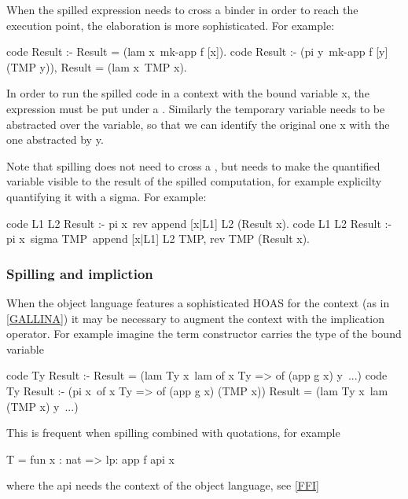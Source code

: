 \documentclass[a4paper, 11pt]{book}
\begin{document}
When the spilled expression needs to cross a binder in order to
reach the execution point, the elaboration is more sophisticated.
For example: 

\begin{elpicode}
code Result :- Result = (lam x\ {mk-app f [x]}).
code Result :- (pi y\ mk-app f [y] (TMP y)), Result = (lam x\ TMP x).
\end{elpicode}
  

In order to run the spilled code in a context with the bound variable
x, the expression must be put under a . Similarly
the temporary variable needs to be abstracted over the variable, so
that we can identify the original one x with the one abstracted by
 y.

Note that spilling does not need to cross a , but
needs to make the quantified variable visible to the result of
the spilled computation, for example explicilty quantifying it
with a sigma. For example:

\begin{elpicode}
  code L1 L2 Result :- pi x\ rev {append [x|L1] L2} (Result x).
  code L1 L2 Result :- pi x\ sigma TMP\ append [x|L1] L2 TMP, rev TMP (Result x).
\end{elpicode}

\subsubsection{Spilling and impliction}

When the object language features a sophisticated HOAS for the context
(as in \ref{GALLINA}) it may be necessary to augment the context with
the implication operator. For example imagine the 
term constructor carries the type of the bound variable

\begin{elpicode}
  code Ty Result :- Result = (lam Ty x\ lam {of x Ty => of (app g x)} y\ ...)
  code Ty Result :-
    (pi x\ of x Ty => of (app g x) (TMP x))
    Result = (lam Ty x\ lam (TMP x) y\ ...)
\end{elpicode}

This is frequent when spilling combined with quotations, for example

\begin{elpicode}
  T = {{ fun x : nat => lp:{{ app f {api x}  }}  }}
\end{elpicode}

where the api needs the context of the object language, see \ref{FFI}
\end{document}
